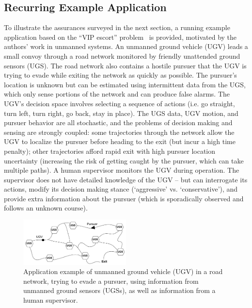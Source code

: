 \subsection{Recurring Example Application} \label{sec:mot_example}
    To illustrate the assurances surveyed in the next section, a running example application based on the ``VIP escort'' problem~\cite{Humphrey2012-lr} is provided, motivated by the authors' work in unmanned systems. 
    An unmanned ground vehicle (UGV) leads a small convoy through a road network monitored by friendly unattended ground sensors (UGS). The road network also contains a hostile pursuer that the UGV is trying to evade while exiting the network as quickly as possible. 
    The pursuer's location is unknown but can be estimated using intermittent data from the UGS, which only sense portions of the network and can produce false alarms. The UGV's decision space involves selecting a sequence of actions (i.e. go straight, turn left, turn right, go back, stay in place). The UGS data, UGV motion, and pursuer behavior are all stochastic, and the problems of decision making and sensing are strongly coupled: some trajectories through the network allow the UGV to localize the pursuer before heading to the exit (but incur a high time penalty); other trajectories afford rapid exit with high pursuer location uncertainty (increasing the risk of getting caught by the pursuer, which can take multiple paths). 
    A human supervisor monitors the UGV during operation. 
    The supervisor does not have detailed knowledge of the UGV -- but can interrogate its actions, modify its decision making stance (`aggressive' vs. `conservative'), and provide extra information about the pursuer (which is sporadically observed and follows an unknown course). %
    
	\begin{figure}[t]%
    	\centering
     	\includegraphics[width=0.5\textwidth]{Figures/RoadNet}
    	\caption{Application example of unmanned ground vehicle (UGV) in a road network, trying to evade a pursuer, using information from unmanned ground sensors (UGSs), as well as information from a human supervisor.} %
        \label{fig:RoadNet}
    \end{figure}

